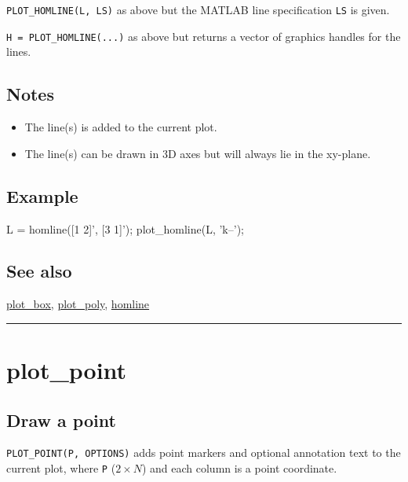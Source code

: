 \texttt{PLOT\_HOMLINE(L, LS)} as above but the MATLAB line specification \texttt{LS} is given.



\texttt{H = PLOT\_HOMLINE(...)} as above but returns a vector of graphics handles for the lines.


\subsection*{Notes}
\begin{itemize}
  \item The line(s) is added to the current plot.
  \item The line(s) can be drawn in 3D axes but will always lie in the    xy-plane.
\end{itemize}

\subsection*{Example}
\begin{Code}
    L = homline([1 2]', [3 1]'); %
    plot_homline(L, 'k--'); %

\end{Code}

\subsection*{See also}


\hyperlink{plot_box}{\color{blue} plot\_box}, \hyperlink{plot_poly}{\color{blue} plot\_poly}, \hyperlink{homline}{\color{blue} homline}

\vspace{1.5ex}\rule{\textwidth}{1mm}

\hypertarget{plot\_point}{\section*{plot\_point}}
\subsection*{Draw a point}


\texttt{PLOT\_POINT(P, OPTIONS)} adds point markers and optional annotation text
to the current plot, where \texttt{P} ($2 \times N$) and each column is a point coordinate.



